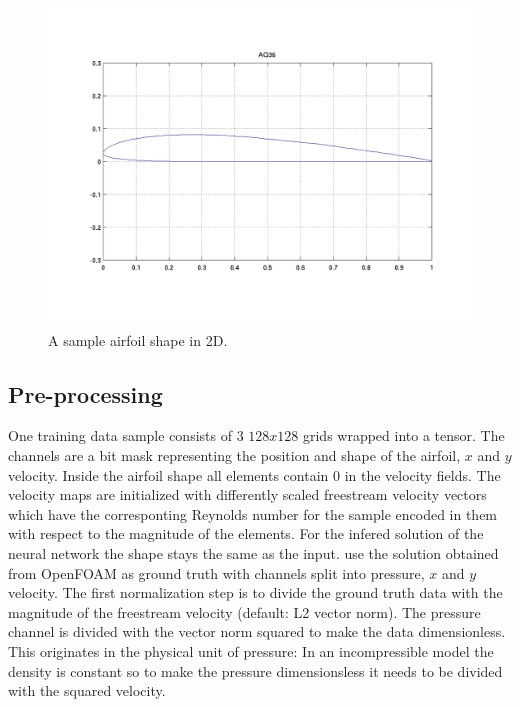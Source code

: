 \documentclass[acmtog]{techreportacmart}
\begin{document}
\begin{figure}[H]
  \includegraphics[width=.4\textwidth]{figures/uiuc_sample}
  \vspace*{-10mm}
  \caption{A sample airfoil shape in 2D.}
  \label{fig:one}
\end{figure}

\subsection{Pre-processing}
One training data sample consists of $3$ $128x128$ grids wrapped into a tensor. The channels are a bit mask representing the position and shape of the airfoil, $x$ and $y$ velocity. Inside the airfoil shape all elements contain $0$ in the velocity fields. The velocity maps are initialized with differently scaled freestream velocity vectors which have the corresponting Reynolds number for the sample encoded in them with respect to the magnitude of the elements. For the infered solution of the neural network the shape stays the same as the input. \cite{Thuerey20} use the solution obtained from OpenFOAM as ground truth with channels split into pressure, $x$ and $y$ velocity. The first normalization step is to divide the  ground truth data with the magnitude of the freestream velocity (default: L2 vector norm). The pressure channel is divided with the vector norm squared to make the data dimensionless. This originates in the physical unit of pressure: In an incompressible model the density is constant so to make the pressure dimensionsless it needs to be divided with the squared velocity. \\
\end{document}
